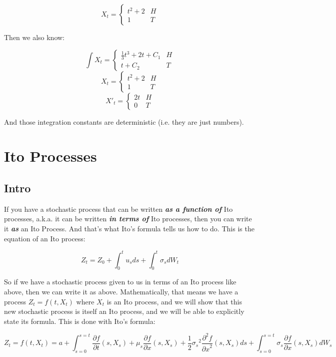 \documentclass{article}
\begin{document}
\[X_t = \begin{cases} 
    t^2 + 2 & H \\
    1 & T 
 \end{cases}
\]

Then we also know:

\[\int X_t = \begin{cases} 
    \frac{1}{3}t^3 + 2t + C_1 & H \\
    t + C_2 & T 
 \end{cases}
\]
\[X_t = \begin{cases} 
    t^2 + 2 & H \\
    1 & T 
 \end{cases}
\]
\[X'_t = \begin{cases} 
    2t & H \\
    0 & T 
 \end{cases}
\]

And those integration constants are deterministic (i.e. they are just numbers).

\section{Ito Processes}

\subsection{Intro}

If you have a stochastic process that can be written \textbf{\emph{as a function of}} Ito processes, a.k.a. it can be written \textbf{\emph{in terms of}} Ito processes, then you can write it \textbf{\emph{as}} an Ito Process. And that's what Ito's formula tells us how to do.  This is the equation of an Ito process:

$$Z_t = Z_0 + \int_{0}^{t} u_s ds + \int_{0}^{t} \sigma_s dW_t$$

So if we have a stochastic process given to us in terms of an Ito process like above, then we can write it as above. Mathematically, that means we have a process $Z_t = f(t,X_t)$ where $X_t$ is an Ito process, and we will show that this new stochastic process is itself an Ito process, and we will be able to explicitly state its formula.  This is done with Ito's formula:

$$Z_t = f(t,X_t) = a + \int_{s=0}^{s=t} \frac{\partial f}{\partial t}(s,X_s) + \mu_s \frac{\partial f}{\partial x}(s,X_s) + \frac{1}{2}{\sigma _s}^2\frac{\partial^2 f}{{\partial x}^2}(s,X_s)  ds + \int_{s=0}^{s=t}\sigma_s\frac{\partial f}{\partial x}(s,X_s) dW_s   $$
\end{document}
